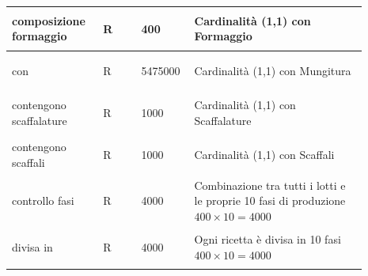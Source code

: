 \documentclass[12pt,a4paper]{article}
\begin{document}
\begin{center}
\begin{longtable}{|p{0.23\linewidth}|p{0.1\linewidth}|p{0.11\linewidth}|p{0.45\linewidth}|}
\hline
composizione formaggio 				& \begin{center}
\vspace{-25pt}R
\end{center}
					& \begin{center}
					\vspace{-25pt}400\end{center}
					&  Cardinalità (1,1) con Formaggio \\ 

\hline
con 				& \begin{center}
\vspace{-25pt}R
\end{center}
					& \begin{center}
					\vspace{-25pt}5475000\end{center}
					&  Cardinalità (1,1) con Mungitura \\ 

\hline
contengono scaffalature 				& \begin{center}
\vspace{-25pt}R
\end{center}
					& \begin{center}
					\vspace{-25pt}1000\end{center}
					&  Cardinalità (1,1) con Scaffalature \\ 

\hline
contengono scaffali 				& \begin{center}
\vspace{-25pt}R
\end{center}
					& \begin{center}
					\vspace{-25pt}1000\end{center}
					&  Cardinalità (1,1) con Scaffali \\ 

\hline
controllo fasi 				& \begin{center}
\vspace{-25pt}R
\end{center}
					& \begin{center}
					\vspace{-25pt}4000\end{center}
					&  Combinazione tra tutti i lotti e le proprie 10 fasi di produzione $400\times 10=4000$ \\ 

\hline
divisa in 				& \begin{center}
\vspace{-25pt}R
\end{center}
					& \begin{center}
					\vspace{-25pt}4000\end{center}
					&  Ogni ricetta è divisa in 10 fasi $400\times 10= 4000$\\ 


\end{longtable}
\end{center}
\end{document}
